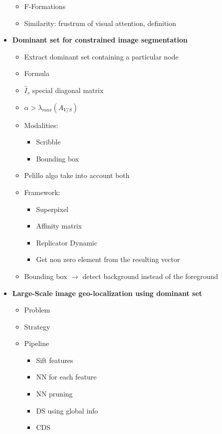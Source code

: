 \documentclass[12pt,oneside]{report}
\begin{document}
\begin{itemize}
\begin{itemize}
        \item F-Formations
        \item Similarity: frustrum of visual attention, definition
    \end{itemize}
    \item \textbf{Dominant set for constrained image segmentation}
    \begin{itemize}
        \item Extract dominant set containing a particular node
        \item Formula
        \item \(\hat{I}_s\) special diagonal matrix
        \item \(\alpha > \lambda_{max}(A_{V/S})\)
        \item Modalities:
        \begin{itemize}
            \item Scribble
            \item Bounding box
        \end{itemize}
        \item Pelillo algo take into account both
        \item Framework:
        \begin{itemize}
            \item Superpixel
            \item Affinity matrix
            \item Replicator Dynamic
            \item Get non zero element from the resulting vector
        \end{itemize}
        \item Bounding box \(\rightarrow\) detect background instead of the foreground
    \end{itemize}
    \item \textbf{Large-Scale image geo-localization using dominant set}
    \begin{itemize}
        \item Problem
        \item Strategy
        \item Pipeline
        \begin{itemize}
            \item Sift features
            \item NN for each feature
            \item NN pruning
            \item DS using global info
            \item CDS

\end{itemize}
\end{itemize}
\end{itemize}
\end{document}
